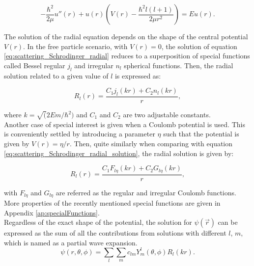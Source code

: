 \documentclass[openany]{book}
\begin{document}
\begin{equation}\label{eq:scattering_Schrodinger_radial_u}
	- \frac{\hbar^2}{2 \mu}u''(r)  + u(r) \left( V(r)  - \frac{\hbar^2l(l+1)}{2 \mu r^2}  \right  ) = E u(r).
\end{equation}

The solution of the radial equation depends on the shape of the central potential $V(r)$. In the free particle scenario, with $V(r) = 0$, the solution of equation \ref{eq:scattering_Schrodinger_radial} reduces to a superposition of special functions called Bessel regular $j_l$ and irregular $n_l$ spherical functions. Then, the radial solution related to a given value of $l$ is expressed as:


\begin{equation}\label{eq:scattering_Schrodinger_radial_solution}
	R_l(r) = \frac{C_1j_l(kr) + C_2n_l(kr)}{r},
\end{equation}

where $k = \sqrt(2Em/\hbar^2)$ and $C_1$ and $C_2$ are two adjustable constants. \\

Another case of special interest is given when a Coulomb potential is used. This is conveniently settled by introducing a parameter $\eta$ such that the potential is given by $V(r) = \eta/r$. Then, quite similarly when comparing with equation \ref{eq:scattering_Schrodinger_radial_solution}, the radial solution is given by: 

\begin{equation}\label{eq:scattering_Schrodinger_radial_solution_coulomb}
	R_l(r) = \frac{C_1F_{l\eta}(kr) + C_2 G_{l\eta}(kr)}{r},
\end{equation}

with $F_{l\eta}$ and $G_{l\eta}$ are referred as the regular and irregular Coulomb functions. More properties of the recently mentioned special functions are given in Appendix \ref{ap:specialFunctions}. \\

Regardless of the exact shape of the potential, the solution for $\psi(\vec r)$ can be expressed as the sum of all the contributions from solutions with different $l$, $m$, which is named as a partial wave expansion.  \\

\begin{equation}   \label{eq:partialWaveExpansion_definition_general}
	\psi(r, \theta, \phi) =  \sum_{l} \sum_{m} {c_{lm}Y_{m}^{l}(\theta, \phi)R_l(kr)}.
\end{equation}
\end{document}
